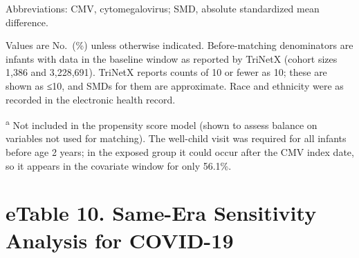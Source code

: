 \documentclass[11pt]{article}
\begin{document}
\begin{landscape}
Abbreviations: CMV, cytomegalovirus; SMD, absolute
standardized mean difference.

Values are No.~(\%) unless otherwise indicated.
Before-matching denominators are infants with data in the
baseline window as reported by TriNetX (cohort sizes 1,386
and 3,228,691). TriNetX reports counts of 10 or fewer as 10;
these are shown as ≤10, and SMDs for them are approximate.
Race and ethnicity were as recorded in the electronic health
record.

\textsuperscript{a} Not included in the propensity score
model (shown to assess balance on variables not used for
matching). The well-child visit was required for all infants
before age 2 years; in the exposed group it could occur
after the CMV index date, so it appears in the covariate
window for only 56.1\%.

\newpage

\hypertarget{etable-10.-same-era-sensitivity-analysis-for-covid-19}{%
\section*{eTable 10. Same-Era Sensitivity Analysis for
COVID-19}\label{etable-10.-same-era-sensitivity-analysis-for-covid-19}}


\end{landscape}
\end{document}
